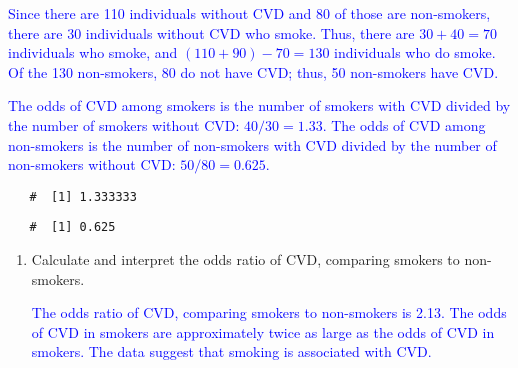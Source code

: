 \documentclass[letterpaper,12pt,twoside,]{pinp}
\begin{document}
\begin{enumerate}
\begin{enumerate}
    \textcolor{blue}{Since there are 110 individuals without CVD and 80 of those are non-smokers, there are 30 individuals without CVD who smoke. Thus, there are $30 + 40 = 70$ individuals who smoke, and $(110 + 90) - 70 = 130$ individuals who do smoke. Of the 130 non-smokers, 80 do not have CVD; thus, 50 non-smokers have CVD.}

    \textcolor{blue}{The odds of CVD among smokers is the number of smokers with CVD divided by the number of smokers without CVD: $40/30 = 1.33$. The odds of CVD among non-smokers is the number of non-smokers with CVD divided by the number of non-smokers without CVD: $50/80 = 0.625$.}
  \end{enumerate}

\begin{Shaded}
\begin{Highlighting}[]
\StringTok{ }\OperatorTok{/}
\StringTok{ }\OperatorTok{/}

\end{Highlighting}
\end{Shaded}

  \begin{ShadedResult}
   \begin{verbatim}
   #  [1] 1.333333
   \end{verbatim}
   \end{ShadedResult}

\begin{Shaded}
\begin{Highlighting}[]
\end{Highlighting}
\end{Shaded}

  \begin{ShadedResult}
   \begin{verbatim}
   #  [1] 0.625
   \end{verbatim}
   \end{ShadedResult}

  \begin{enumerate}
  \def\labelenumii{\alph{enumii})}
  \setcounter{enumii}{2}
  \item
    Calculate and interpret the odds ratio of CVD, comparing smokers to
    non-smokers.

    \textcolor{blue}{The odds ratio of CVD, comparing smokers to non-smokers is 2.13. The odds of CVD in smokers are approximately twice as large as the odds of CVD in smokers. The data suggest that smoking is associated with CVD.}
  \end{enumerate}


\end{enumerate}
\end{document}
